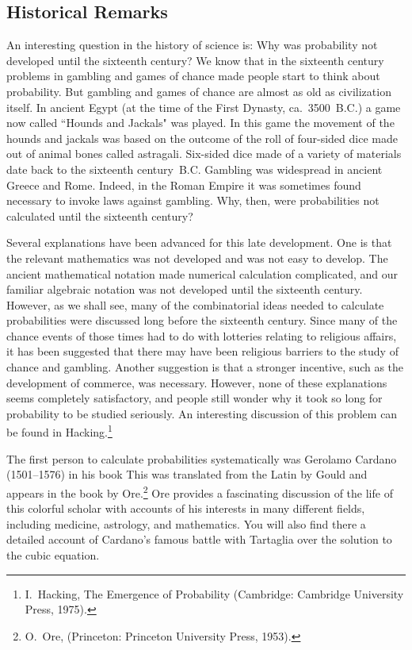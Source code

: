 \subsection*{Historical Remarks}

An interesting question in the history of science is: Why was probability not
developed until the sixteenth century?  We know that in the sixteenth century
problems in gambling and games of chance made people start to think about
probability.  But gambling and games of chance are almost as old as
civilization itself.  In ancient Egypt (at the time of the First Dynasty,
ca.~3500~{\footnotesize\rm {B.C.}}) a game now called ``Hounds and Jackals"
was played. 
In this game the movement of the hounds and jackals was based on the outcome
of
the roll of four-sided dice made out of animal bones called astragali. 
Six-sided
dice made of a variety of materials date back to the sixteenth
century~{\footnotesize\rm {B.C.}}  Gambling
was widespread in ancient Greece and Rome.  Indeed, 
in the Roman Empire it was
sometimes found necessary to invoke laws against gambling.  Why, then, were
probabilities not calculated until the sixteenth century?

Several explanations have been advanced for this late development.  One is
that
the relevant mathematics was not developed and was not easy to develop.  The
ancient mathematical notation made numerical calculation complicated, and our
familiar algebraic notation was not developed until the sixteenth century. 
However, as we shall see, many of the combinatorial ideas needed to calculate
probabilities were discussed long before the sixteenth century.  Since many
of
the chance events of those times had to do with lotteries relating to
religious
affairs, it has been suggested that there may have been religious barriers to
the study of chance and gambling.  Another suggestion is that a stronger
incentive, such as the development of commerce, was necessary.  However, none
of these explanations seems completely satisfactory, and people still wonder
why it took so long for probability to be studied seriously.  An interesting
discussion of this problem can be found in Hacking.\footnote{I.~Hacking,
\emx
{The Emergence of Probability} (Cambridge: Cambridge University Press,
1975).}
\par
The first person to calculate probabilities systematically was Gerolamo
Cardano
(1501--1576) in his book   This was translated from
the Latin by Gould and appears in the book 
by Ore.\footnote{O.~Ore, 
(Princeton:
Princeton University Press, 1953).}  Ore provides a fascinating discussion of
the life of this colorful scholar with accounts of his interests in many
different fields, including medicine, astrology, and mathematics.  You will
also find there a detailed account of Cardano's famous battle with Tartaglia
over the solution to the cubic equation.

